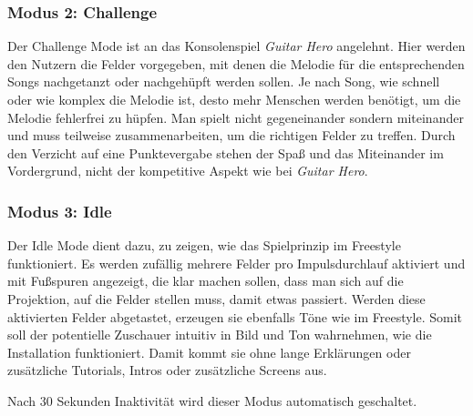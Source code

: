 \subsubsection{Modus 2: Challenge}

Der Challenge Mode ist an das Konsolenspiel \textit{Guitar Hero} angelehnt. Hier werden den Nutzern die Felder vorgegeben, mit denen die Melodie für die entsprechenden Songs nachgetanzt oder nachgehüpft werden sollen. Je nach Song, wie schnell oder wie komplex die Melodie ist, desto mehr Menschen werden benötigt, um die Melodie fehlerfrei zu hüpfen. Man spielt nicht gegeneinander sondern miteinander und muss teilweise zusammenarbeiten, um die richtigen Felder zu treffen. Durch den Verzicht auf eine Punktevergabe stehen der Spaß und das Miteinander im Vordergrund, nicht der kompetitive Aspekt wie bei \textit{Guitar Hero}.

\subsubsection{Modus 3: Idle}

Der Idle Mode dient dazu, zu zeigen, wie das Spielprinzip im Freestyle funktioniert. Es werden zufällig mehrere Felder pro Impulsdurchlauf aktiviert und mit Fußspuren angezeigt, die klar machen sollen, dass man sich auf die Projektion, auf die Felder stellen muss, damit etwas passiert. Werden diese aktivierten Felder abgetastet, erzeugen sie ebenfalls Töne wie im Freestyle. Somit soll der potentielle Zuschauer intuitiv in Bild und Ton wahrnehmen, wie die Installation funktioniert. Damit kommt sie ohne lange Erklärungen oder zusätzliche Tutorials, Intros oder zusätzliche Screens aus.

Nach 30 Sekunden Inaktivität wird dieser Modus automatisch geschaltet.






